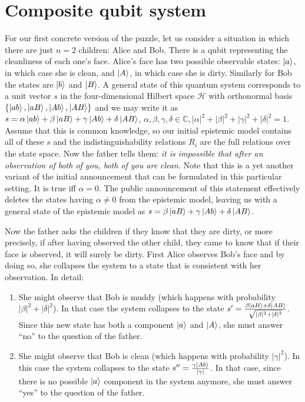 \documentclass[a4paper]{article}
\newcommand{\HH}{\mathcal{H}}
\begin{document}
\section*{Composite qubit system}
For our first concrete version of the puzzle, let us consider a situation in
which there are just $n = 2$ children: Alice and Bob. There is a qubit
representing the cleanliness of each one's face. Alice's face has two possible
observable states: $\ket{a}$, in which case she is clean, and $\ket{A}$, in
which case she is dirty. Similarly for Bob the states are $\ket{b}$ and
$\ket{B}$. A general state of this quantum system corresponds to a unit vector
$s$ in the four-dimensional Hilbert space $\HH$ with orthonormal basis $\{\ket{ab},
\ket{aB}, \ket{Ab}, \ket{AB}\}$ and we may write it as $s = \alpha \ket{ab} +
\beta \ket{aB} + \gamma \ket{Ab} + \delta \ket{AB}$, $\alpha, \beta, \gamma,
\delta \in \mathbb{C}, |\alpha|^2 + |\beta|^2 + |\gamma|^2 + |\delta|^2 = 1$.
Assume that this is common knowledge, so our initial epistemic model contains
all of these $s$ and the indistinguishability relations $R_i$ are the full
relations over the state space.
Now the father tells them: \emph{it is impossible that after an observation of
both of you, both of you are clean}. Note that this is a yet another variant of
the initial announcement that can be formulated in this particular setting. It
is true iff $\alpha = 0$. The public announcement of this statement effectively
deletes the states having $\alpha \neq 0$ from the epistemic model, leaving us
with a general state of the epistemic model as $s = \beta\ket{aB} +
\gamma\ket{Ab} + \delta\ket{AB}$.

Now the father asks the children if they know that they are dirty, or more
precisely, if after having observed the other child, they came to know that if
their face is observed, it will surely be dirty. First Alice observes Bob's
face and by doing so, she collapses the system to a state that is consistent
with her observation. In detail:
\begin{enumerate}
    \item She might observe that Bob is muddy (which happens with probability
        $|\beta|^2 + |\delta|^2$). In that case the system collapses to the state
        $s' = \frac{\beta\ket{aB} + \delta\ket{AB}}{\sqrt{|\beta|^2 +
        |\delta|^2}}$.
        Since this new state has both a component $\ket{a}$ and $\ket{A}$, she
        must answer ``no'' to the question of the father.
    \item She might observe that Bob is clean (which happens with probability
        $|\gamma|^2$). In this case the system collapses to the state $s'' =
        \frac{\gamma\ket{Ab}}{|\gamma|}$. In that case, since there is no
        possible $\ket{a}$ component in the system anymore, she must answer
        ``yes'' to the question of the father.
\end{enumerate}
\end{document}
